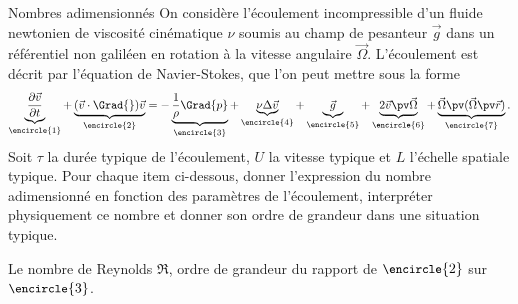 %




\begin{exo}[PC][2][appli]{Nombres adimensionnés}
  \hauteurLargeurCadreReponse		{8mm}{4cm}
 On considère l'écoulement incompressible d'un fluide newtonien de viscosité cinématique $\nu$ soumis au champ de pesanteur $\Vec{g}$ dans un référentiel non galiléen en rotation à la vitesse angulaire $\Vec{\Omega}$. L'écoulement est décrit par l'équation de Navier-Stokes, que l'on peut mettre sous la forme 
 $$
  \underbrace{\frac{\partial \Vec{v}}{\partial t}}_{\small\encircle{1}} + \underbrace{(\Vec{v} \cdot \Grad{}) \Vec{v}}_{\small\encircle{2}} = - \underbrace{\frac{1}{\rho}\Grad{p}}_{\small\encircle{3}} + \underbrace{\nu \Delta \Vec{v}}_{\small\encircle{4}} + \underbrace{\Vec{g}}_{\small\encircle{5}} + \underbrace{2 \Vec{v} \pv \Vec{\Omega}}_{\small\encircle{6}} + \underbrace{\Vec{\Omega} \pv (\Vec{\Omega} \pv \Vec{r})}_{\small\encircle{7}}.
 $$
  Soit $\tau$ la durée typique de l'écoulement, $U$ la vitesse typique et $L$ l'échelle spatiale typique. Pour chaque item ci-dessous, donner l'expression du nombre adimensionné en fonction des paramètres de l'écoulement, interpréter physiquement ce nombre et donner son ordre de grandeur dans une situation typique.  

  \begin{enonce}
  	Le nombre de Reynolds $\Re$, ordre de grandeur du rapport de ${\small\encircle{2}}$ sur ${\small\encircle{3}}$.
  \end{enonce}


\end{exo}
